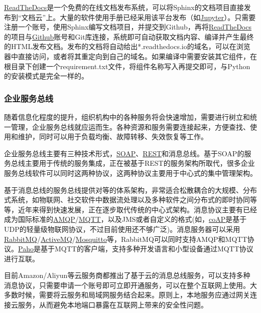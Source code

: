 \documentclass[letterpaper,10pt,english]{sphinxmanual}
\begin{document}
\href{http://www.ReadTheDocs.org}{ReadTheDocs}是一个免费的在线文档发布系统，可以将Sphinx的文档项目直接发布到“文档云”上。大量的软件使用手册已经采用该平台发布（如\href{http://jupyter.readthedocs.io/en/latest/}{Jupyter}）。只需要注册一个账号，使用Sphinx编写文档项目，并提交到Github，再将\href{http://www.ReadTheDocs.org}{ReadTheDocs}的项目与\href{http://github.com}{Github}账号和Git库连接，系统即可自动获取文档内容、编译并产生最终的HTML发布文档。发布的文档将自动给出*.readthedocs.io的域名，可以在浏览器中直接访问，或者将其重定向到自己的域名。如果编译中需要安装其它组件，在根目录下创建一个requirement.txt文件，将组件名称写入再提交即可，与Python的安装模式是完全一样的。


\subsubsection{企业服务总线}
\label{gispark_paas:_u4f01_u4e1a_u670d_u52a1_u603b_u7ebf}
随着信息化程度的提升，组织机构中的各种服务将会快速增加，需要进行树立和统一管理，企业服务总线就应运而生。各种资源和服务需要连接起来，方便查找、使用和维护，同时可以用于负载均衡、故障转移、失效恢复等工作。

企业服务总线主要有三种技术形式，\href{http://www.bing.com/knows/search?q=\%E7\%AE\%80\%E5\%8D\%95\%E5\%AF\%B9\%E8\%B1\%A1\%E8\%AE\%BF\%E9\%97\%AE\%E5\%8D\%8F\%E8\%AE\%AE\&mkt=zh-cn\&FORM=BKACAI}{SOAP}、\href{http://www.bing.com/knows/search?q=rest\&mkt=zh-cn\&FORM=BKACAI}{REST}和消息总线。基于SOAP的服务总线主要用于传统的服务集成，正在被基于REST的服务架构所取代，很多企业服务总线软件可以同时这两种协议，这两种协议主要用于中心式的集中管理架构。

基于消息总线的服务总线提供对等的体系架构，非常适合松散耦合的大规模、分布式系统，如物联网、社交软件中数据流处理以及多种软件之间分布式的即时协同等等，近年来得到快速发展，正在逐步取代传统的中心式架构。消息协议主要有已经成为国际标准的\href{http://www.amqp.org/}{AMQP}/\href{http://mqtt.org/}{MQTT}，以及JMS或者自定义的格式(如，\href{http://blog.csdn.net/xukai871105/article/details/17734163}{coAP}是基于UDP的轻量级物联网协议，不过目前使用还不够广泛)。消息服务器可以采用\href{http://rabbitmq.org}{RabbitMQ}/\href{http://activemq.apache.org}{ActiveMQ}/\href{http://mosquitto.org/}{Mosquitto}等，RabbitMQ可以同时支持AMQP和MQTT协议。\href{http://www.eclipse.org/paho/}{Paho}是基于MQTT的客户端，支持多种开发语言和小型设备通过MQTT协议进行互联。

目前Amazon/Aliyun等云服务商都推出了基于云的消息总线服务，可以支持多种消息协议，只需要申请一个账号即可立即开通服务，可以在整个互联网上使用。大多数时候，需要将云服务和局域网服务结合起来。原则上，本地服务应通过网关连接云服务，从而避免本地端口暴露在互联网上带来的安全性问题。
\end{document}
